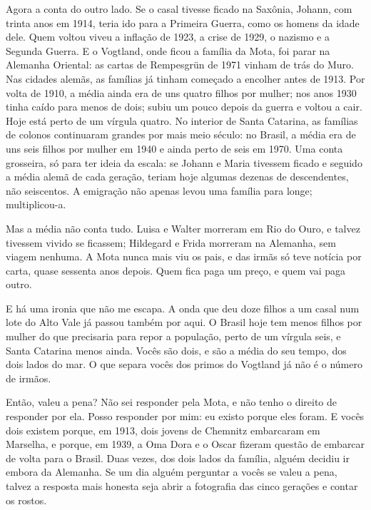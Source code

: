 \documentclass[
  brazilian,
  11pt,
  openany]{book}
\begin{document}
Agora a conta do outro lado. Se o casal tivesse ficado na Saxônia,
Johann, com trinta anos em 1914, teria ido para a Primeira Guerra, como
os homens da idade dele. Quem voltou viveu a inflação de 1923, a crise
de 1929, o nazismo e a Segunda Guerra. E o Vogtland, onde ficou a
família da Mota, foi parar na Alemanha Oriental: as cartas de Rempesgrün
de 1971 vinham de trás do Muro. Nas cidades alemãs, as famílias já
tinham começado a encolher antes de 1913. Por volta de 1910, a média
ainda era de uns quatro filhos por mulher; nos anos 1930 tinha caído
para menos de dois; subiu um pouco depois da guerra e voltou a cair.
Hoje está perto de um vírgula quatro. No interior de Santa Catarina, as
famílias de colonos continuaram grandes por mais meio século: no Brasil,
a média era de uns seis filhos por mulher em 1940 e ainda perto de seis
em 1970. Uma conta grosseira, só para ter ideia da escala: se Johann e
Maria tivessem ficado e seguido a média alemã de cada geração, teriam
hoje algumas dezenas de descendentes, não seiscentos. A emigração não
apenas levou uma família para longe; multiplicou-a.

Mas a média não conta tudo. Luisa e Walter morreram em Rio do Ouro, e
talvez tivessem vivido se ficassem; Hildegard e Frida morreram na
Alemanha, sem viagem nenhuma. A Mota nunca mais viu os pais, e das irmãs
só teve notícia por carta, quase sessenta anos depois. Quem fica paga um
preço, e quem vai paga outro.

E há uma ironia que não me escapa. A onda que deu doze filhos a um casal
num lote do Alto Vale já passou também por aqui. O Brasil hoje tem menos
filhos por mulher do que precisaria para repor a população, perto de um
vírgula seis, e Santa Catarina menos ainda. Vocês são dois, e são a
média do seu tempo, dos dois lados do mar. O que separa vocês dos primos
do Vogtland já não é o número de irmãos.

Então, valeu a pena? Não sei responder pela Mota, e não tenho o direito
de responder por ela. Posso responder por mim: eu existo porque eles
foram. E vocês dois existem porque, em 1913, dois jovens de Chemnitz
embarcaram em Marselha, e porque, em 1939, a Oma Dora e o Oscar fizeram
questão de embarcar de volta para o Brasil. Duas vezes, dos dois lados
da família, alguém decidiu ir embora da Alemanha. Se um dia alguém
perguntar a vocês se valeu a pena, talvez a resposta mais honesta seja
abrir a fotografia das cinco gerações e contar os rostos.
\end{document}
